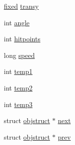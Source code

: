 \begin{DoxyCompactItemize}
\item 
\hyperlink{WL__DEF_8H_aaf54715c9b83afe8794059fcf5fd5e7e}{fixed} \hyperlink{structobjstruct_a017e48f3fcc380a118517e79f57da3f3}{transy}
\item 
int \hyperlink{structobjstruct_a0c7bd64d662506dd6a03df52a1fd5174}{angle}
\item 
int \hyperlink{structobjstruct_a495f6dd9bfd94df650690287b889218f}{hitpoints}
\item 
long \hyperlink{structobjstruct_ab5dd932d85f14d29041532c09c7c378b}{speed}
\item 
int \hyperlink{structobjstruct_a511c457af684a9746eb5975ae93a3db6}{temp1}
\item 
int \hyperlink{structobjstruct_a6fd5576deea2a136ddc0526c5b5459bc}{temp2}
\item 
int \hyperlink{structobjstruct_a9303ee72c924bf4ae9908c0534878390}{temp3}
\item 
struct \hyperlink{structobjstruct}{objstruct} $\ast$ \hyperlink{structobjstruct_a9f994ec147ce0156fef7a07fd426ba21}{next}
\item 
struct \hyperlink{structobjstruct}{objstruct} $\ast$ \hyperlink{structobjstruct_aae3f857ffdec95bbe69ceb661adb6cc6}{prev}
\end{DoxyCompactItemize}


